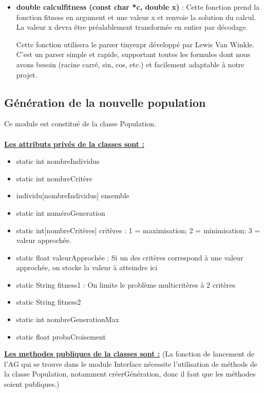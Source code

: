 \documentclass[a4paper,11pt]{article}
\begin{document}
\begin{itemize}
							\item \textbf{double calculfitness (const char *c, double x)} : Cette fonction prend la fonction fitness en argument et une valeur x et renvoie la solution du calcul. La valeur x devra être préalablement transformée en entier par décodage.

								Cette fonction utilisera le parser tinyexpr développé par Lewis Van Winkle. 
								C’est un parser simple et rapide, supportant toutes les formules dont nous avons besoin (racine carré, sin, cos, etc.) et facilement adaptable à notre projet. 
					\end{itemize}
					
		\subsection{Génération de la nouvelle population}
			Ce module est constitué de la classe Population.\\
			\\
			\underline{\bf Les attributs privés de la classes sont :}\\
				\begin{itemize}
				\item static int nombreIndividus
				\item static int nombreCritère
				\item individu[nombreIndividus] ensemble
				\item static int numéroGeneration
				\item static int[nombreCritères] critères : 1  = maximisation; 2 = minimisation; 3 = valeur approchée.
				\item static float valeurApprochée : Si un des critères correspond à une valeur approchée, on stocke la valeur à atteindre ici
				\item static String fitness1 : On limite le problème multicritères à 2 critères
				\item static String fitness2
				\item static int nombreGenerationMax
				\item static float probaCroisement\\
			\end{itemize}
			\underline{\bf Les methodes publiques de la classes sont :} (La fonction de lancement de l'AG qui se trouve dans le module Interface nécessite l'utilisation de méthods de la classe Population, notamment créerGénération, donc il faut que les méthodes soient publiques.)\\\\
\end{document}
